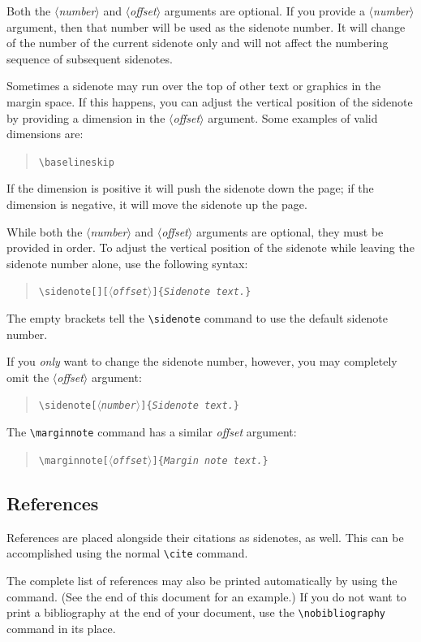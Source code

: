 \documentclass{tufte-handout}
\newcommand{\doccmd}[1]{\texttt{\textbackslash#1}}%
\newcommand{\docopt}[1]{\ensuremath{\langle}\textrm{\textit{#1}}\ensuremath{\rangle}}%
\newcommand{\docarg}[1]{\textrm{\textit{#1}}}%
\newenvironment{docspec}{\begin{quote}\noindent}{\end{quote}}%
\begin{document}
Both the \docopt{number} and \docopt{offset} arguments are optional.  If you
provide a \docopt{number} argument, then that number will be used as the
sidenote number.  It will change of the number of the current sidenote only and
will not affect the numbering sequence of subsequent sidenotes.

Sometimes a sidenote may run over the top of other text or graphics in the
margin space.  If this happens, you can adjust the vertical position of the
sidenote by providing a dimension in the \docopt{offset} argument.  Some
examples of valid dimensions are:
\begin{docspec}
  \ttfamily 1.0in \qquad 2.54cm \qquad 254mm \Verb|\baselineskip|
\end{docspec}
If the dimension is positive it will push the sidenote down the page; if the
dimension is negative, it will move the sidenote up the page.

While both the \docopt{number} and \docopt{offset} arguments are optional, they
must be provided in order.  To adjust the vertical position of the sidenote
while leaving the sidenote number alone, use the following syntax:
\begin{docspec}
  \doccmd{sidenote[][\docopt{offset}]\{\docarg{Sidenote text.}\}}
\end{docspec}
The empty brackets tell the \Verb|\sidenote| command to use the default
sidenote number.

If you \emph{only} want to change the sidenote number, however, you may
completely omit the \docopt{offset} argument:
\begin{docspec}
  \doccmd{sidenote[\docopt{number}]\{\docarg{Sidenote text.}\}}
\end{docspec}

The \Verb|\marginnote| command has a similar \docarg{offset} argument:
\begin{docspec}
  \doccmd{marginnote[\docopt{offset}]\{\docarg{Margin note text.}\}}
\end{docspec}

\subsection{References}
References are placed alongside their citations as sidenotes,
as well.  This can be accomplished using the normal \Verb|\cite|
command.

The complete list of references may also be printed automatically by using
the \Verb|| command.  (See the end of this document for an
example.)  If you do not want to print a bibliography at the end of your
document, use the \Verb|\nobibliography| command in its place.
\end{document}
